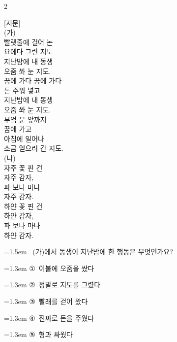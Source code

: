 \documentclass[12pt, a4paper]{article}
\begin{document}
\begin{multicols}{2}
\vspace{1mm}
\vspace{0.5mm}

\begin{passagebox}
\noindent{}[지문] \\
(가) \\
빨랫줄에 걸어 논 \\
요에다 그린 지도 \\
지난밤에 내 동생 \\
오줌 쏴 눈 지도.
\\[0.5em]
꿈에 가다 꿈에 가다 \\
돈 주워 넣고 \\
지난밤에 내 동생 \\
오줌 쏴 눈 지도.
\\[0.5em]
부엌 문 앞까지 \\
꿈에 가고 \\
아침에 일어나 \\
소금 얻으러 간 지도.
\\[0.5em]
(나) \\
자주 꽃 핀 건 \\
자주 감자, \\
파 보나 마나 \\
자주 감자.
\\[0.5em]
하얀 꽃 핀 건 \\
하얀 감자, \\
파 보나 마나 \\
하얀 감자.
\end{passagebox}
\vspace{1mm}

\noindent\begin{minipage}{\columnwidth}
\vspace{2mm}
{\hangindent=1.5em  ~(가)에서 동생이 지난밤에 한 행동은 무엇인가요?\par}

\vspace{0.5mm}
{\hangindent=1.3em  \noindent\hspace{0.3em}①~이불에 오줌을 쌌다\par}
{\hangindent=1.3em  \noindent\hspace{0.3em}②~정말로 지도를 그렸다\par}
{\hangindent=1.3em  \noindent\hspace{0.3em}③~빨래를 걷어 왔다\par}
{\hangindent=1.3em  \noindent\hspace{0.3em}④~진짜로 돈을 주웠다\par}
{\hangindent=1.3em  \noindent\hspace{0.3em}⑤~형과 싸웠다\par}
\vspace{4mm}
\end{minipage}
\par


\end{multicols}
\end{document}
